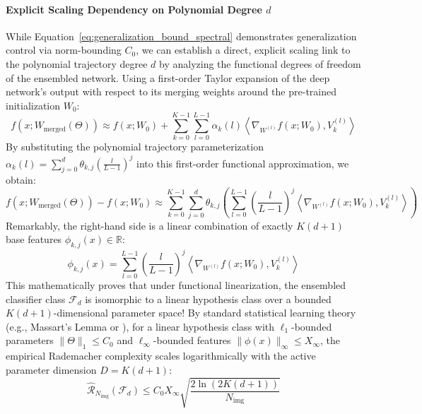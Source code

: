 \paragraph{Explicit Scaling Dependency on Polynomial Degree $d$}
While Equation~\ref{eq:generalization_bound_spectral} demonstrates generalization control via norm-bounding $C_0$, we can establish a direct, explicit scaling link to the polynomial trajectory degree $d$ by analyzing the functional degrees of freedom of the ensembled network.
Using a first-order Taylor expansion of the deep network's output with respect to its merging weights around the pre-trained initialization $W_0$:
\begin{equation}
f\left(x; W_{\text{merged}}(\Theta)\right) \approx f(x; W_0) + \sum_{k=0}^{K-1} \sum_{l=0}^{L-1} \alpha_k(l) \left\langle \nabla_{W^{(l)}} f(x; W_0), V_k^{(l)} \right\rangle
\end{equation}
By substituting the polynomial trajectory parameterization $\alpha_k(l) = \sum_{j=0}^d \theta_{k,j} \left(\frac{l}{L-1}\right)^j$ into this first-order functional approximation, we obtain:
\begin{equation}
f\left(x; W_{\text{merged}}(\Theta)\right) - f(x; W_0) \approx \sum_{k=0}^{K-1} \sum_{j=0}^d \theta_{k,j} \left( \sum_{l=0}^{L-1} \left(\frac{l}{L-1}\right)^j \left\langle \nabla_{W^{(l)}} f(x; W_0), V_k^{(l)} \right\rangle \right)
\end{equation}
Remarkably, the right-hand side is a linear combination of exactly $K(d+1)$ base features $\phi_{k,j}(x) \in \mathbb{R}$:
\begin{equation}
\phi_{k,j}(x) = \sum_{l=0}^{L-1} \left(\frac{l}{L-1}\right)^j \left\langle \nabla_{W^{(l)}} f(x; W_0), V_k^{(l)} \right\rangle
\end{equation}
This mathematically proves that under functional linearization, the ensembled classifier class $\mathcal{F}_d$ is isomorphic to a linear hypothesis class over a bounded $K(d+1)$-dimensional parameter space! 
By standard statistical learning theory (e.g., Massart's Lemma or \cite{shalev2014understanding}), for a linear hypothesis class with $\ell_1$-bounded parameters $\|\Theta\|_1 \le C_0$ and $\ell_\infty$-bounded features $\|\phi(x)\|_\infty \le X_\infty$, the empirical Rademacher complexity scales logarithmically with the active parameter dimension $D = K(d+1)$:
\begin{equation}
\label{eq:generalization_bound_dimension}
\widehat{\mathcal{R}}_{N_{\text{img}}}(\mathcal{F}_d) \le C_0 X_\infty \sqrt{\frac{2 \ln\left(2 K (d + 1)\right)}{N_{\text{img}}}}
\end{equation}
